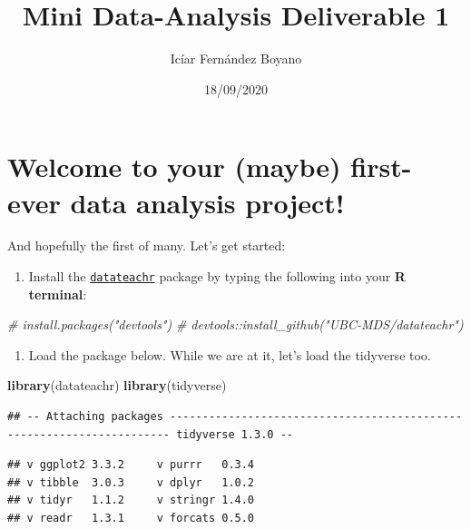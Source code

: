 \documentclass[
]{article}
\title{Mini Data-Analysis Deliverable 1}
\author{Icíar Fernández Boyano}
\date{18/09/2020}
\newenvironment{Shaded}{\begin{snugshade}}{\end{snugshade}}
\newcommand{\CommentTok}[1]{\textcolor[rgb]{0.56,0.35,0.01}{\textit{#1}}}
\newcommand{\KeywordTok}[1]{\textcolor[rgb]{0.13,0.29,0.53}{\textbf{#1}}}
\newcommand{\NormalTok}[1]{#1}
\providecommand{\tightlist}{%
  \setlength{\itemsep}{0pt}\setlength{\parskip}{0pt}}
\begin{document}
\maketitle

\hypertarget{welcome-to-your-maybe-first-ever-data-analysis-project}{%
\section{Welcome to your (maybe) first-ever data analysis
project!}\label{welcome-to-your-maybe-first-ever-data-analysis-project}}

And hopefully the first of many. Let's get started:

\begin{enumerate}
\def\labelenumi{\arabic{enumi}.}
\tightlist
\item
  Install the
  \href{https://github.com/UBC-MDS/datateachr}{\texttt{datateachr}}
  package by typing the following into your \textbf{R terminal}:
\end{enumerate}

\begin{Shaded}
\begin{Highlighting}[]
\CommentTok{\# install.packages("devtools")}
\CommentTok{\# devtools::install\_github("UBC{-}MDS/datateachr")}
\end{Highlighting}
\end{Shaded}

\begin{enumerate}
\def\labelenumi{\arabic{enumi}.}
\setcounter{enumi}{1}
\tightlist
\item
  Load the package below. While we are at it, let's load the tidyverse
  too.
\end{enumerate}

\begin{Shaded}
\begin{Highlighting}[]
\KeywordTok{library}\NormalTok{(datateachr)}
\KeywordTok{library}\NormalTok{(tidyverse)}
\end{Highlighting}
\end{Shaded}

\begin{verbatim}
## -- Attaching packages ---------------------------------------------------------------------- tidyverse 1.3.0 --
\end{verbatim}

\begin{verbatim}
## v ggplot2 3.3.2     v purrr   0.3.4
## v tibble  3.0.3     v dplyr   1.0.2
## v tidyr   1.1.2     v stringr 1.4.0
## v readr   1.3.1     v forcats 0.5.0
\end{verbatim}
\end{document}
